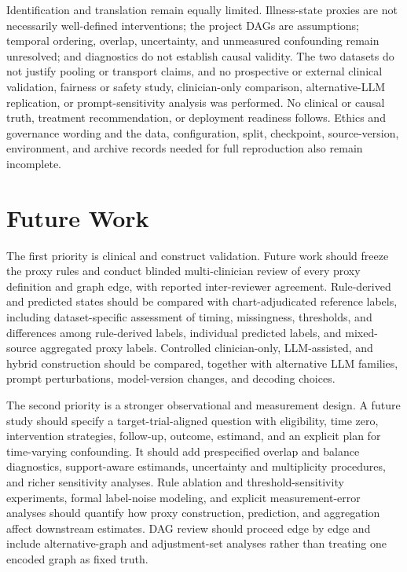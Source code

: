 Identification and translation remain equally limited.  Illness-state proxies are not necessarily well-defined interventions; the project DAGs are assumptions; temporal ordering, overlap, uncertainty, and unmeasured confounding remain unresolved; and diagnostics do not establish causal validity.  The two datasets do not justify pooling or transport claims, and no prospective or external clinical validation, fairness or safety study, clinician-only comparison, alternative-LLM replication, or prompt-sensitivity analysis was performed.  No clinical or causal truth, treatment recommendation, or deployment readiness follows.  Ethics and governance wording and the data, configuration, split, checkpoint, source-version, environment, and archive records needed for full reproduction also remain incomplete.

\section{Future Work}
\label{sec:conclusions-future-work:future-work}

The first priority is clinical and construct validation.  Future work should freeze the proxy rules and conduct blinded multi-clinician review of every proxy definition and graph edge, with reported inter-reviewer agreement.  Rule-derived and predicted states should be compared with chart-adjudicated reference labels, including dataset-specific assessment of timing, missingness, thresholds, and differences among rule-derived labels, individual predicted labels, and mixed-source aggregated proxy labels.  Controlled clinician-only, LLM-assisted, and hybrid construction should be compared, together with alternative LLM families, prompt perturbations, model-version changes, and decoding choices.

The second priority is a stronger observational and measurement design.  A future study should specify a target-trial-aligned question with eligibility, time zero, intervention strategies, follow-up, outcome, estimand, and an explicit plan for time-varying confounding.  It should add prespecified overlap and balance diagnostics, support-aware estimands, uncertainty and multiplicity procedures, and richer sensitivity analyses.  Rule ablation and threshold-sensitivity experiments, formal label-noise modeling, and explicit measurement-error analyses should quantify how proxy construction, prediction, and aggregation affect downstream estimates.  DAG review should proceed edge by edge and include alternative-graph and adjustment-set analyses rather than treating one encoded graph as fixed truth.

